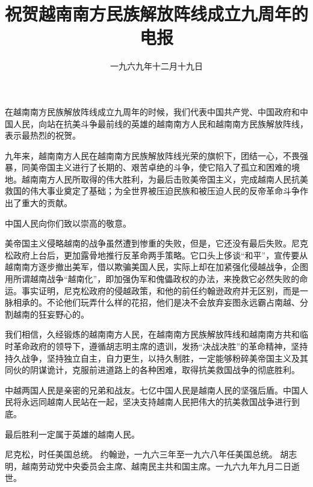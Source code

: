 
\title{祝贺越南南方民族解放阵线成立九周年的电报}
\date{一九六九年十二月十九日}
\maketitle




在越南南方民族解放阵线成立九周年的时候，我们代表中国共产党、中国政府和中国人民，向站在抗美斗争最前线的英雄的越南南方人民和越南南方民族解放阵线，表示最热烈的祝贺。

九年来，越南南方人民在越南南方民族解放阵线光荣的旗帜下，团结一心，不畏强暴，同美帝国主义进行了长期的、艰苦卓绝的斗争，使它陷入了孤立和困难的境地。越南南方人民所取得的伟大胜利，为最后击败美帝国主义，完成越南人民抗美救国的伟大事业奠定了基础；为全世界被压迫民族和被压迫人民的反帝革命斗争作出了重大的贡献。

中国人民向你们致以崇高的敬意。

美帝国主义侵略越南的战争虽然遭到惨重的失败，但是，它还没有最后失败。尼克松政府上台后，更加露骨地推行反革命两手策略。它口头上侈谈“和平”，宣传要从越南南方逐步撤出美军，借以欺骗美国人民，实际上却在加紧强化侵越战争，企图用所谓越南战争“越南化”，即加强伪军和傀儡政权的办法，来挽救它必然失败的命运。事实证明，尼克松政府的侵越政策，和他的前任约翰逊政府并无区别，而是一脉相承的。不论他们玩弄什么样的花招，他们是决不会放弃妄图永远霸占南越、分割越南的狂妄野心的。

我们相信，久经锻炼的越南南方人民，在越南南方民族解放阵线和越南南方共和临时革命政府的领导下，遵循胡志明主席的遗训，发扬“决战决胜”的革命精神，坚持持久战争，坚持独立自主，自力更生，以持久制胜，一定能够粉碎美帝国主义及其同伙的阴谋诡计，克服前进道路上的各种困难，取得抗美救国战争的彻底胜利。

中越两国人民是亲密的兄弟和战友。七亿中国人民是越南人民的坚强后盾。中国人民将永远同越南人民站在一起，坚决支持越南人民把伟大的抗美救国战争进行到底。

最后胜利一定属于英雄的越南人民。

\begin{maonote}
尼克松，时任美国总统。
约翰逊，一九六三年至一九六八年任美国总统。
胡志明，越南劳动党中央委员会主席、越南民主共和国主席。一九六九年九月二日逝世。
\end{maonote}
